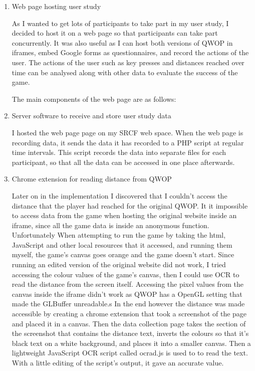 \documentclass[12pt,a4paper,twoside,openright]{report}
\begin{document}
\begin{enumerate}
	\item Web page hosting user study

	As I wanted to get lots of participants to take part in my user study, I decided to host it on a web page so that participants can take part concurrently. It was also useful as I can host both versions of QWOP in iframes, embed Google forms as questionnaires, and record the actions of the user. The actions of the user such as key presses and distances reached over time can be analysed along with other data to evaluate the success of the game.

	The main components of the web page are as follows:

	\userStudySections

    \item Server software to receive and store user study data

    I hosted the web page page on my SRCF web space. When the web page is recording data, it sends the data it has recorded to a PHP script at regular time intervals. This script records the data into separate files for each participant, so that all the data can be accessed in one place afterwards.

    \item Chrome extension for reading distance from QWOP

    Later on in the implementation I discovered that I couldn't access the distance that the player had reached for the original QWOP. It it impossible to access data from the game when hosting the original website inside an iframe, since all the game data is inside an anonymous function.
    Unfortunately When attempting to run the game by taking the html, JavaScript and other local resources that it accessed, and running them myself, the game's canvas goes orange and the game doesn't start.
    Since running an edited version of the original website did not work, I tried accessing the colour values of the game's canvas, then I could use OCR to read the distance from the screen itself. Accessing the pixel values from the canvas inside the iframe didn't work as QWOP has a OpenGL setting that made the GLBuffer unreadable.s
    In the end however the distance was made accessible by creating a chrome extension that took a screenshot of the page and placed it in a canvas. Then the data collection page takes the section of the screenshot that contains the distance text, inverts the colours so that it's black text on a white background, and places it into a smaller canvas. Then a lightweight JavaScript OCR script called ocrad.js is used to to read the text. With a little editing of the script's output, it gave an accurate value.
\end{enumerate}
\end{document}
